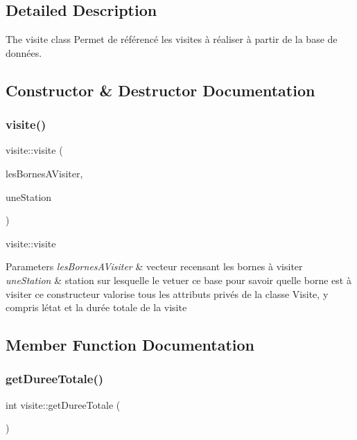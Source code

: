 \subsection{Detailed Description}
The visite class Permet de référencé les visites à réaliser à partir de la base de données. 

\subsection{Constructor \& Destructor Documentation}
\mbox{\label{classvisite_a197936c1244f7c9fd0a2eca7038533f9}} 
\subsubsection{\texorpdfstring{visite()}{visite()}}
{\footnotesize\ttfamily visite\+::visite (\begin{DoxyParamCaption}\item[{Q\+Vector$<$ \hyperlink{class_borne}{Borne} $>$}]{les\+Bornes\+A\+Visiter,  }\item[{\hyperlink{class_station}{Station} $\ast$}]{une\+Station }\end{DoxyParamCaption})}



visite\+::visite 


\begin{DoxyParams}{Parameters}
{\em les\+Bornes\+A\+Visiter} & vecteur recensant les bornes à visiter \\
\hline
{\em une\+Station} & station sur lesquelle le vetuer ce base pour savoir quelle borne est à visiter ce constructeur valorise tous les attributs privés de la classe Visite, y compris l\textquotesingle{}état et la durée totale de la visite \\
\hline
\end{DoxyParams}


\subsection{Member Function Documentation}
\mbox{\label{classvisite_a608738dbddc358c0805228e0aac5818c}} 
\subsubsection{\texorpdfstring{get\+Duree\+Totale()}{getDureeTotale()}}
{\footnotesize\ttfamily int visite\+::get\+Duree\+Totale (\begin{DoxyParamCaption}{ }\end{DoxyParamCaption})}



